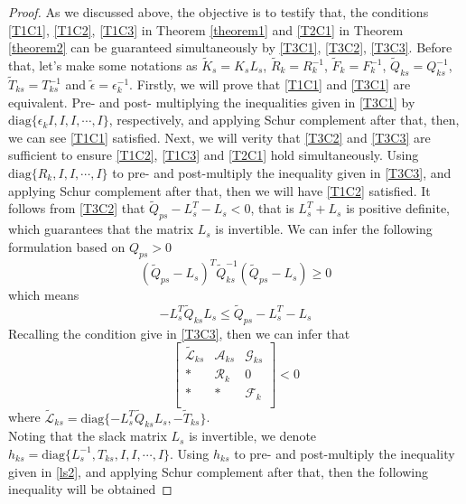 \documentclass[conference]{IEEEtran}
\begin{document}
\begin{proof}
	As we discussed above, the objective is to testify that, the conditions \eqref{T1C1}, \eqref{T1C2}, \eqref{T1C3} in Theorem \ref{theorem1} and \eqref{T2C1} in Theorem \ref{theorem2}  can be guaranteed simultaneously by \eqref{T3C1}, \eqref{T3C2}, \eqref{T3C3}. Before that, let's make some notations as $\tilde{K}_{s}=K_{s}L_{s}$, $\tilde{R}_{k}=R^{-1}_{k}$, $\tilde{F}_{k}=F^{-1}_{k}$, $\tilde{Q}_{ks}=Q^{-1}_{ks}$, $\tilde{T}_{ks}=T^{-1}_{ks}$ and  $\tilde{\epsilon}=\epsilon^{-1}_{k}$. 
	Firstly, we will prove that \eqref{T1C1} and \eqref{T3C1} are equivalent. Pre- and post- multiplying the inequalities given in \eqref{T3C1} by $\mathrm{diag}\{\epsilon_{k}I, I,I,\cdots,I \}$, respectively, and applying  Schur complement after that, then, we can see \eqref{T1C1} satisfied.  
	Next, we will verity that \eqref{T3C2} and \eqref{T3C3} are sufficient  to ensure \eqref{T1C2}, \eqref{T1C3} and \eqref{T2C1} hold simultaneously.  Using $\mathrm{diag}\{R_{k}, I ,I,\cdots, I \}$  to pre- and post-multiply the inequality given in \eqref{T3C3}, and applying Schur complement after that, then we will have \eqref{T1C2} satisfied.  
	It follows from  \eqref{T3C2} that $\tilde{Q}_{ps}-L^{T}_{s}-L_{s}<0$, that is $L^{T}_{s}+L_{s} $ is positive definite, which guarantees that the matrix  $L_{s}$ is invertible. We can infer the following formulation based on $Q_{ps}>0$
	\begin{equation}
		(\tilde{Q}_{ps} - L_{s} )^{T}\tilde{Q}^{-1}_{ks}(\tilde{Q}_{ps} - L_{s} )\geq 0
	\end{equation}
	which means 
	\begin{equation}
		-L^{T}_{s}\tilde{Q}_{ks}L_{s} \leq  \tilde{Q}_{ps}-L^{T}_{s}-L_{s}
	\end{equation}
	Recalling the condition give in \eqref{T3C3}, then we can infer that
	 \begin{equation} \label{ls2}
	 	\begin{bmatrix}
	 	\tilde{\mathscr{L}}_{ks}&\mathscr{A}_{ks}&\mathscr{G}_{ks}\\
	 	*&\mathscr{R}_{k}&0\\
	 	*&*&\mathscr{F}_{k}\\
	 	\end{bmatrix}<0
	 \end{equation}
	 where $\tilde{\mathscr{L}}_{ks}= \mathrm{diag}\{-L^{T}_{s}\tilde{Q}_{ks}L_{s},  -\tilde{T}_{ks} \}$. \\
	 Noting that the slack matrix $L_{s}$ is invertible, we denote $h_{ks}= \mathrm{diag}\{L^{-1}_{s}, T_{ks}, I, I,\cdots, I \}$. Using $h_{ks}$ to  pre- and post-multiply the inequality given in \eqref{ls2}, and applying Schur complement after that, then the following inequality will be obtained

\end{proof}
\end{document}
